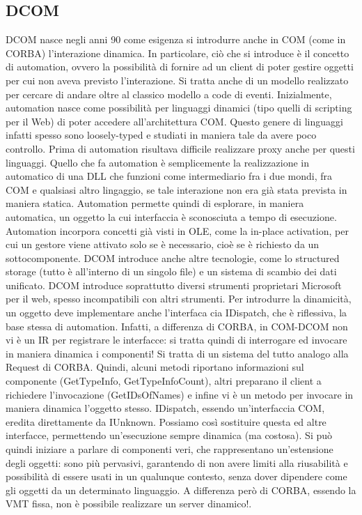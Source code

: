 \subsection{DCOM}
DCOM nasce negli anni 90 come esigenza si introdurre anche in COM (come in CORBA) l'interazione dinamica. In 
particolare, ciò che si introduce è il concetto di automation, ovvero la possibilità di fornire ad un client di poter
gestire oggetti per cui non aveva previsto l'interazione. Si tratta anche di un modello realizzato per cercare di andare 
oltre al classico modello a code di eventi.
Inizialmente, automation nasce come possibilità per linguaggi dinamici (tipo quelli di scripting per il Web) di poter 
accedere all'architettura COM. Questo genere di linguaggi infatti spesso sono loosely-typed e studiati in maniera tale
da avere poco controllo. Prima di automation risultava difficile realizzare proxy anche per questi linguaggi.
Quello che fa automation è semplicemente la realizzazione in automatico di una DLL che funzioni come intermediario fra i 
due mondi, fra COM e qualsiasi altro lingaggio, se tale interazione non era già stata prevista in maniera statica.
Automation permette quindi di esplorare, in maniera automatica, un oggetto la cui interfaccia è sconosciuta a tempo di 
esecuzione. Automation incorpora concetti già visti in OLE, come la in-place activation, per cui un gestore viene
attivato solo se è necessario, cioè se è richiesto da un sottocomponente. DCOM introduce anche altre tecnologie, come lo 
structured storage (tutto è all'interno di un singolo file) e un sistema di scambio dei dati unificato. DCOM introduce
soprattutto diversi strumenti proprietari Microsoft per il web, spesso incompatibili con altri strumenti.
Per introdurre la dinamicità, un oggetto deve implementare anche l'interfaca cia IDispatch, che è riflessiva, la base 
stessa di automation. Infatti, a differenza di CORBA, in COM-DCOM non vi è un IR per registrare le interfacce: si tratta
quindi di interrogare ed invocare in maniera dinamica i componenti! Si tratta di un sistema del tutto analogo alla 
Request di CORBA.
Quindi, alcuni metodi riportano informazioni sul componente (GetTypeInfo, GetTypeInfoCount), altri preparano il client a 
richiedere l'invocazione (GetIDsOfNames) e infine vi è un metodo per invocare in maniera dinamica l'oggetto stesso. 
IDispatch, essendo un'interfaccia COM, eredita direttamente da IUnknown. Possiamo così sostituire questa ed altre 
interfacce, permettendo un'esecuzione sempre dinamica (ma costosa).
Si può quindi iniziare a parlare di componenti veri, che rappresentano un'estensione degli oggetti: sono più pervasivi, 
garantendo di non avere limiti alla riusabilità e possibilità di essere usati in un qualunque contesto, senza dover 
dipendere come gli oggetti da un determinato linguaggio.
A differenza però di CORBA, essendo la VMT fissa, non è possibile realizzare un server dinamico!.
